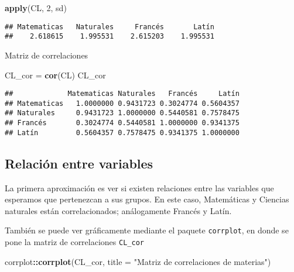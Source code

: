 \documentclass[11pt,spanish,]{article}
\newenvironment{Shaded}{\begin{snugshade}}{\end{snugshade}}
\newcommand{\DataTypeTok}[1]{\textcolor[rgb]{0.13,0.29,0.53}{#1}}
\newcommand{\DecValTok}[1]{\textcolor[rgb]{0.00,0.00,0.81}{#1}}
\newcommand{\KeywordTok}[1]{\textcolor[rgb]{0.13,0.29,0.53}{\textbf{#1}}}
\newcommand{\NormalTok}[1]{#1}
\newcommand{\OperatorTok}[1]{\textcolor[rgb]{0.81,0.36,0.00}{\textbf{#1}}}
\newcommand{\StringTok}[1]{\textcolor[rgb]{0.31,0.60,0.02}{#1}}
\begin{document}
\begin{Shaded}
\begin{Highlighting}[]
\KeywordTok{apply}\NormalTok{(CL, }\DecValTok{2}\NormalTok{, sd)}
\end{Highlighting}
\end{Shaded}

\begin{verbatim}
## Matematicas   Naturales     Francés       Latín 
##    2.618615    1.995531    2.615203    1.995531
\end{verbatim}

Matriz de correlaciones

\begin{Shaded}
\begin{Highlighting}[]
\NormalTok{CL_cor =}\StringTok{ }\KeywordTok{cor}\NormalTok{(CL)}
\NormalTok{CL_cor}
\end{Highlighting}
\end{Shaded}

\begin{verbatim}
##             Matematicas Naturales   Francés     Latín
## Matematicas   1.0000000 0.9431723 0.3024774 0.5604357
## Naturales     0.9431723 1.0000000 0.5440581 0.7578475
## Francés       0.3024774 0.5440581 1.0000000 0.9341375
## Latín         0.5604357 0.7578475 0.9341375 1.0000000
\end{verbatim}

\hypertarget{relacion-entre-variables}{%
\subsection{Relación entre variables}\label{relacion-entre-variables}}

La primera aproximación es ver si existen relaciones entre las variables
que esperamos que pertenezcan a sus grupos. En este caso, Matemáticas y
Ciencias naturales están correlacionados; análogamente Francés y Latín.

También se puede ver gráficamente mediante el paquete \texttt{corrplot},
en donde se pone la matriz de correlaciones \texttt{CL\_cor}

\begin{Shaded}
\begin{Highlighting}[]
\NormalTok{corrplot}\OperatorTok{::}\KeywordTok{corrplot}\NormalTok{(CL_cor, }\DataTypeTok{title =} \StringTok{"Matriz de correlaciones de materias"}\NormalTok{)}
\end{Highlighting}
\end{Shaded}
\end{document}
